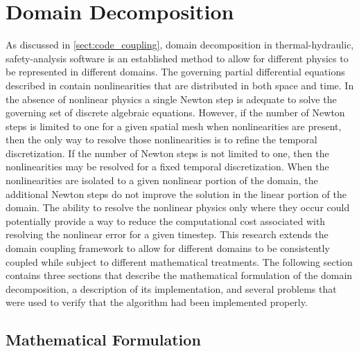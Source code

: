 \chapter{Domain Decomposition}
\label{chap:domain_decomposition}
As discussed in \ref{sect:code_coupling}, domain decomposition in thermal-hydraulic, safety-analysis software is an established method to allow for different physics to be represented in different domains.
The governing partial differential equations described in  contain nonlinearities that are distributed in both space and time.
In the absence of nonlinear physics a single Newton step is adequate to solve the governing set of discrete algebraic equations.
However, if the number of Newton steps is limited to one for a given spatial mesh when nonlinearities are present, then the only way to resolve those nonlinearities is to refine the temporal discretization.
If the number of Newton steps is not limited to one, then the nonlinearities may be resolved for a fixed temporal discretization.
When the nonlinearities are isolated to a given nonlinear portion of the domain, the additional Newton steps do not improve the solution in the linear portion of the domain.
The ability to resolve the nonlinear physics only where they occur could potentially provide a way to reduce the computational cost associated with resolving the nonlinear error for a given timestep.
This research extends the domain coupling framework to allow for different domains to be consistently coupled while subject to different mathematical treatments.
The following section contains three sections that describe the mathematical formulation of the domain decomposition, a description of its implementation, and several problems that were used to verify that the algorithm had been implemented properly.

\section{Mathematical Formulation}
\label{sec:domDecompMath}

